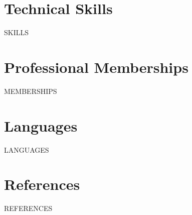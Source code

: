 \documentclass[11pt,a4paper,serif]{article}
\begin{document}
\section{Technical Skills}
{{SKILLS}}

\section{Professional Memberships}
{{MEMBERSHIPS}}

\section{Languages}
{{LANGUAGES}}

\section{References}
{{REFERENCES}}
\end{document}
